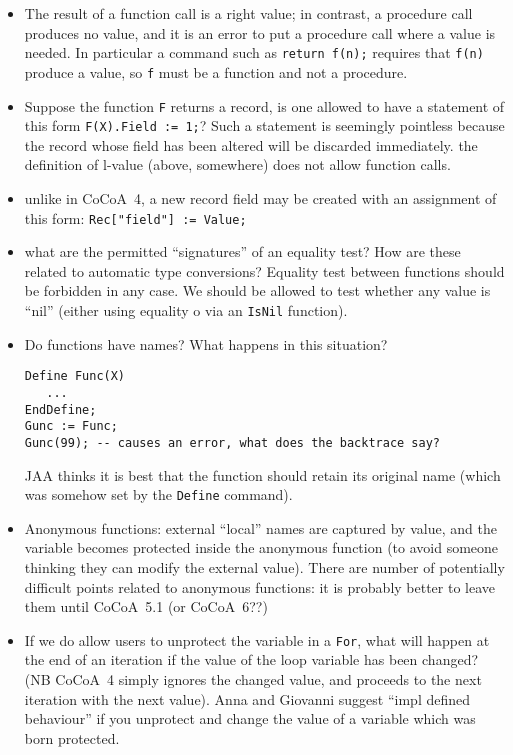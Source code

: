 \documentclass{book}[12,a4paper]
\begin{document}
\begin{itemize}

\item The result of a function call is a right value; in contrast, a procedure call
  produces no value, and it is an error to put a procedure call where a value is needed.
  In particular a command such as \texttt{return f(n);} requires that \texttt{f(n)} produce
  a value, so \texttt{f} must be a function and not a procedure.

\item Suppose the function \texttt{F} returns a record, is one allowed to
  have a statement of this form \texttt{F(X).Field := 1;}?  Such a statement
  is seemingly pointless because the record whose field has been altered
  will be discarded immediately.  the definition of l-value (above, somewhere)
  does not allow function calls.

\item unlike in CoCoA~4, a new record field may be created with an
  assignment of this form: \texttt{Rec["field"] := Value;}

\item what are the permitted ``signatures'' of an equality test?  How are
  these related to automatic type conversions?  Equality test between
  functions should be forbidden in any case.  We should be allowed to test
  whether any value is ``nil'' (either using equality o via an \texttt{IsNil}
  function).  

\item  Do functions have names?  What happens in this situation?
\begin{lstlisting}
Define Func(X)
   ...
EndDefine;
Gunc := Func;
Gunc(99); -- causes an error, what does the backtrace say?
\end{lstlisting}
JAA thinks it is best that the function should retain its original name (which
was somehow set by the \texttt{Define} command).

\item Anonymous functions: external ``local'' names are captured by value,
  and the variable becomes protected inside the anonymous function (to
  avoid someone thinking they can modify the external value).  There are
  number of potentially difficult points related to anonymous functions:
  it is probably better to leave them until CoCoA~5.1 (or CoCoA~6??)

\item {}
  If we do allow
  users to unprotect the variable in a \texttt{For}, what will happen at the
  end of an iteration if the value of the loop variable has been changed?
  (NB CoCoA~4 simply ignores the changed value, and proceeds to the next
  iteration with the next value).  Anna and Giovanni suggest ``impl defined
  behaviour'' if you unprotect and change the value of a variable which
  was born protected.

\end{itemize}
\end{document}
